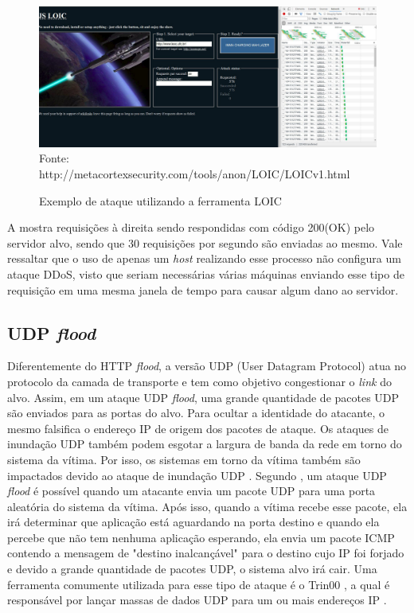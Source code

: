  \begin{figure}[ht]
 	\centering
 	\caption{Exemplo de ataque utilizando a ferramenta LOIC }
 	\includegraphics[width=1\textwidth]{figs/loic.pdf}\\
 	{Fonte: http://metacortexsecurity.com/tools/anon/LOIC/LOICv1.html}
 	\label{fig:loic}
 \end{figure} 
 
 A  mostra requisições à direita sendo respondidas com código 200(OK) pelo servidor alvo, sendo que 30 requisições por segundo são enviadas ao mesmo. Vale ressaltar que o uso de apenas um \textit{host} realizando  esse processo não configura um ataque DDoS, visto que seriam necessárias várias máquinas enviando esse tipo de requisição em uma mesma janela de tempo para causar algum dano ao servidor.
 
 \subsection{UDP \textit{flood}}
 
 Diferentemente do HTTP \textit{flood}, a versão UDP (User Datagram Protocol) atua no protocolo da camada de transporte e tem como objetivo congestionar o \textit{link} do alvo. Assim, em um ataque UDP \textit{flood}, uma grande quantidade de pacotes UDP são enviados para as portas do alvo. Para ocultar a identidade do atacante, o mesmo falsifica o endereço IP de origem dos pacotes de ataque. Os ataques de inundação UDP também podem esgotar a largura de banda da rede em torno do sistema da vítima. Por isso, os sistemas em torno da vítima também são impactados devido ao ataque de inundação UDP \cite{xiaoming2010denial}. Segundo , um ataque UDP \textit{flood} é possível quando um atacante envia um pacote UDP para uma porta aleatória do sistema da vítima. Após isso, quando a vítima recebe esse pacote, ela irá determinar que aplicação está aguardando na porta destino e quando ela percebe que não tem nenhuma aplicação esperando, ela envia um pacote ICMP contendo a mensagem de "destino inalcançável" para o destino cujo IP foi forjado e devido a grande quantidade de pacotes UDP, o sistema alvo irá cair. Uma ferramenta comumente utilizada para esse tipo de ataque é o Trin00 \cite{criscuolo2000distributed}, a qual é responsável por lançar massas de dados UDP para um ou mais endereços IP \cite{dittrich2002projectos}.
 
